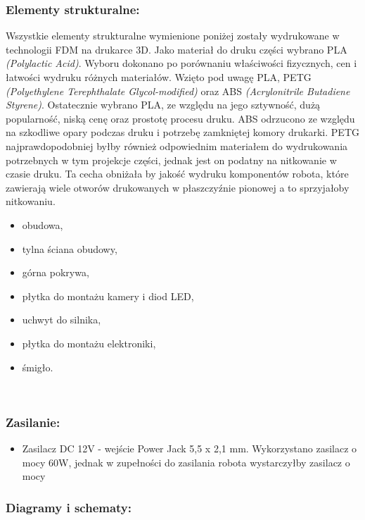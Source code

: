 \subsubsection{Elementy strukturalne:}
Wszystkie elementy strukturalne wymienione poniżej zostały wydrukowane w technologii FDM na drukarce 3D. Jako materiał do druku części wybrano
PLA \textit{(Polylactic Acid)}. Wyboru dokonano po porównaniu właściwości fizycznych, cen i łatwości wydruku różnych materiałów. Wzięto pod uwagę
PLA, PETG \textit{(Polyethylene Terephthalate Glycol-modified)} oraz ABS \textit{(Acrylonitrile Butadiene Styrene)}. Ostatecznie wybrano PLA, ze względu na jego sztywność, dużą popularność,
niską cenę oraz prostotę procesu druku. ABS odrzucono ze względu na szkodliwe opary podczas druku i potrzebę zamkniętej komory drukarki. PETG najprawdopodobniej
byłby również odpowiednim materiałem do wydrukowania potrzebnych w tym projekcje części, jednak jest on podatny na nitkowanie w czasie druku. Ta cecha
obniżała by jakość wydruku komponentów robota, które zawierają wiele otworów drukowanych w płaszczyźnie pionowej a to sprzyjałoby nitkowaniu. \cite{PLA} \cite{PETG} \cite{ABS} \cite{PLA2}
    \begin{itemize}
        \item obudowa,
        \item tylna ściana obudowy,
        \item górna pokrywa,
        \item płytka do montażu kamery i diod LED,
        \item uchwyt do silnika,
        \item płytka do montażu elektroniki,
        \item śmigło.
    \end{itemize}\

\subsubsection{Zasilanie:}
\begin{itemize}
    \item Zasilacz DC 12V - wejście Power Jack 5,5 x 2,1 mm. Wykorzystano zasilacz o mocy 60W, jednak w zupełności do zasilania robota wystarczyłby zasilacz o mocy 
\end{itemize}


\subsubsection{Diagramy i schematy:}

